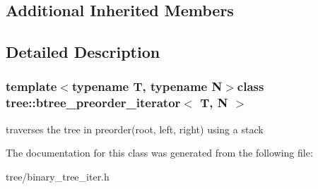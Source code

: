 \subsection*{Additional Inherited Members}


\subsection{Detailed Description}
\subsubsection*{template$<$typename T, typename N$>$class tree\-::btree\-\_\-preorder\-\_\-iterator$<$ T, N $>$}

traverses the tree in preorder(root, left, right) using a stack 

The documentation for this class was generated from the following file\-:\begin{DoxyCompactItemize}
\item 
tree/binary\-\_\-tree\-\_\-iter.\-h\end{DoxyCompactItemize}
